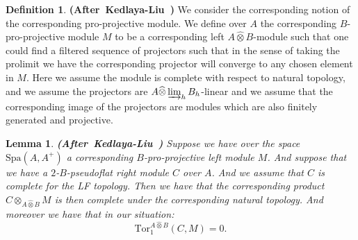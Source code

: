 \documentclass[12pt]{amsart}
\newtheorem{lemma}[theorem]{Lemma}
\theoremstyle{definition}
\newtheorem{definition}[theorem]{Definition}
\numberwithin{equation}{section}
\begin{document}
\begin{definition}\mbox{\bf{(After Kedlaya-Liu \cite[Definition 2.4.6]{KL2})}} We consider the corresponding notion of the corresponding pro-projective module. We define over $A$ the corresponding $B$-pro-projective module $M$ to be a corresponding left $A\widehat{\otimes}B$-module such that one could find a filtered sequence of projectors such that in the sense of taking the prolimit we have the corresponding projector will converge to any chosen element in $M$. Here we assume the module is complete with respect to natural topology, and we assume the projectors are $A\widehat{\otimes}\varinjlim_h B_h$-linear and we assume that the corresponding image of the projectors are modules which are also finitely generated and projective.
	
\end{definition}




\begin{lemma}\mbox{\bf{(After Kedlaya-Liu \cite[Lemma 2.4.7]{KL2})}}
Suppose we have over the space $\mathrm{Spa}(A,A^+)$ a corresponding $B$-pro-projective left module $M$. And suppose that we have a $2$-$B$-pseudoflat right module $C$ over $A$. And we assume that $C$ is complete for the LF topology. Then we have that the corresponding product $C{\otimes}_{A\widehat{\otimes}B}M$ is then complete under the corresponding natural topology. And moreover we have that in our situation:
\begin{displaymath}
\mathrm{Tor}_1^{A\widehat{\otimes}B}(C,M)=0.	
\end{displaymath}

\end{lemma}
\end{document}
